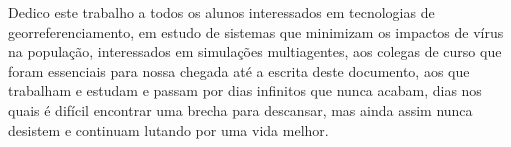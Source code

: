 
Dedico este trabalho a todos os alunos interessados em tecnologias de georreferenciamento, em estudo de sistemas que minimizam os impactos de vírus na população, interessados em simulações multiagentes, aos colegas de curso que foram essenciais para nossa chegada até a escrita deste documento, aos que trabalham e estudam e passam por dias infinitos que nunca acabam, dias nos quais é difícil encontrar uma brecha para descansar, mas ainda assim nunca desistem e continuam lutando por uma vida melhor. 